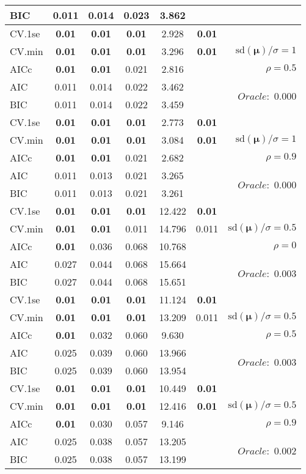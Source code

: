 \begin{table}
\begin{center}
\begin{tabular}{l*{5}{c}|r}
BIC & 0.011 & 0.014 & 0.023 & 3.862 & &  \\
 \hline 
CV.1se & {\bf 0.01} & {\bf 0.01} & {\bf 0.01} & 2.928 & {\bf 0.01} & \\
CV.min & {\bf 0.01} & {\bf 0.01} & {\bf 0.01} & 3.296 & {\bf 0.01} &  $\mathrm{sd}(\mathbf{\mu})/\sigma=1$ \\
AICc & {\bf 0.01} & {\bf 0.01} & 0.021 & 2.816 & & $\rho=0.5$ \\
AIC & 0.011 & 0.014 & 0.022 & 3.462 & &  \multirow{2}{*}{$Oracle: $ 0.000} \\
BIC & 0.011 & 0.014 & 0.022 & 3.459 & &  \\
 \hline 
CV.1se & {\bf 0.01} & {\bf 0.01} & {\bf 0.01} & 2.773 & {\bf 0.01} & \\
CV.min & {\bf 0.01} & {\bf 0.01} & {\bf 0.01} & 3.084 & {\bf 0.01} &  $\mathrm{sd}(\mathbf{\mu})/\sigma=1$ \\
AICc & {\bf 0.01} & {\bf 0.01} & 0.021 & 2.682 & & $\rho=0.9$ \\
AIC & 0.011 & 0.013 & 0.021 & 3.265 & &  \multirow{2}{*}{$Oracle: $ 0.000} \\
BIC & 0.011 & 0.013 & 0.021 & 3.261 & &  \\
 \hline 
CV.1se & {\bf 0.01} & {\bf 0.01} & {\bf 0.01} & 12.422 & {\bf 0.01} & \\
CV.min & {\bf 0.01} & {\bf 0.01} & 0.011 & 14.796 & 0.011 &  $\mathrm{sd}(\mathbf{\mu})/\sigma=0.5$ \\
AICc & {\bf 0.01} & 0.036 & 0.068 & 10.768 & & $\rho=0$ \\
AIC & 0.027 & 0.044 & 0.068 & 15.664 & &  \multirow{2}{*}{$Oracle: $ 0.003} \\
BIC & 0.027 & 0.044 & 0.068 & 15.651 & &  \\
 \hline 
CV.1se & {\bf 0.01} & {\bf 0.01} & {\bf 0.01} & 11.124 & {\bf 0.01} & \\
CV.min & {\bf 0.01} & {\bf 0.01} & {\bf 0.01} & 13.209 & 0.011 &  $\mathrm{sd}(\mathbf{\mu})/\sigma=0.5$ \\
AICc & {\bf 0.01} & 0.032 & 0.060 & 9.630 & & $\rho=0.5$ \\
AIC & 0.025 & 0.039 & 0.060 & 13.966 & &  \multirow{2}{*}{$Oracle: $ 0.003} \\
BIC & 0.025 & 0.039 & 0.060 & 13.954 & &  \\
 \hline 
CV.1se & {\bf 0.01} & {\bf 0.01} & {\bf 0.01} & 10.449 & {\bf 0.01} & \\
CV.min & {\bf 0.01} & {\bf 0.01} & {\bf 0.01} & 12.416 & {\bf 0.01} &  $\mathrm{sd}(\mathbf{\mu})/\sigma=0.5$ \\
AICc & {\bf 0.01} & 0.030 & 0.057 & 9.146 & & $\rho=0.9$ \\
AIC & 0.025 & 0.038 & 0.057 & 13.205 & &  \multirow{2}{*}{$Oracle: $ 0.002} \\
BIC & 0.025 & 0.038 & 0.057 & 13.199 & &  \\
 \hline 
\end{tabular}
\end{center}
\vspace{-1cm}
\end{table}




